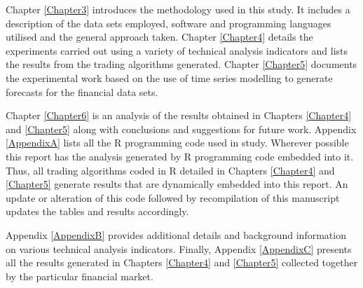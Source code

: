 Chapter \ref{Chapter3} introduces the methodology used in this study. It includes a description of the data sets employed, software and programming languages utilised and the general approach taken. Chapter \ref{Chapter4} details the experiments carried out using a variety of technical analysis indicators and lists the results from the trading algorithms generated. Chapter \ref{Chapter5} documents the experimental work based on the use of time series modelling to generate forecasts for the financial data sets.

Chapter \ref{Chapter6} is an analysis of the results obtained in Chapters \ref{Chapter4} and \ref{Chapter5} along with conclusions and suggestions for future work. Appendix \ref{AppendixA} lists all the R programming code used in study. Wherever possible this report has the analysis generated by R programming code embedded into it. Thus, all trading algorithms coded in R detailed in Chapters \ref{Chapter4} and \ref{Chapter5} generate results that are dynamically embedded into this report. An update or alteration of this code followed by recompilation of this manuscript updates the tables and results accordingly. 

Appendix \ref{AppendixB} provides additional details and background information on various technical analysis indicators. Finally, Appendix \ref{AppendixC} presents all the results generated in Chapters \ref{Chapter4} and \ref{Chapter5} collected together by the particular financial market. 
